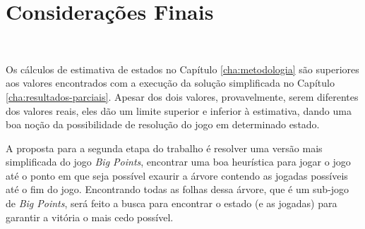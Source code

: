 \chapter[Considerações Finais]{Considerações Finais}\
\label{cha:consideracoes_finais}

Os cálculos de estimativa de estados no Capítulo \ref{cha:metodologia} são superiores aos valores encontrados com a execução da solução simplificada no Capítulo \ref{cha:resultados-parciais}. Apesar dos dois valores, provavelmente, serem diferentes dos valores reais, eles dão um limite superior e inferior à estimativa, dando uma boa noção da possibilidade de resolução do jogo em determinado estado.

A proposta para a segunda etapa do trabalho é resolver uma versão mais simplificada do jogo \emph{Big Points}, encontrar uma boa heurística para jogar o jogo até o ponto em que seja possível exaurir a árvore contendo as jogadas possíveis até o fim do jogo. Encontrando todas as folhas dessa árvore, que é um sub-jogo de \emph{Big Points}, será feito a busca para encontrar o estado (e as jogadas) para garantir a vitória o mais cedo possível.
